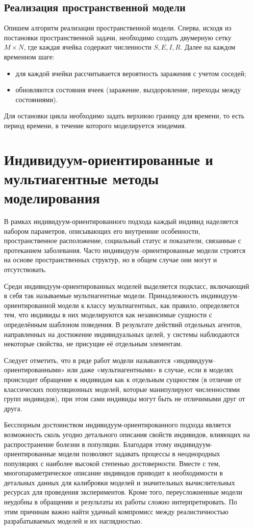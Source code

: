 \documentclass[a4paper, 14pt]{extreport}
\numberwithin{equation}{section}
\begin{document}
	\subsection{Реализация пространственной модели}
	Опишем алгоритм реализации пространственной модели.
	Сперва, исходя из постановки пространственной задачи, необходимо создать двумерную сетку $M\times N$, где каждая ячейка содержит численности $S,E,I,R$. Далее на каждом временном шаге:
	\begin{itemize}
		\item для каждой ячейки рассчитывается вероятность заражения с учетом соседей;
		\item обновляются состояния ячеек (заражение, выздоровление, переходы между состояниями).
	\end{itemize}
	Для остановки цикла необходимо задать верхнюю границу для времени, то есть период времени, в течение которого моделируется эпидемия.
	\section{Индивидуум-ориентированные и мультиагентные методы моделирования}
	В рамках индивидуум-ориентированного подхода каждый
	индивид наделяется набором параметров, описывающих его внутренние
	особенности, пространственное расположение, социальный статус и показатели,
	связанные с протеканием заболевания. Часто индивидуум–ориентированные
	модели строятся на основе пространственных структур, но в общем случае они
	могут и отсутствовать.
	
	Среди индивидуум-ориентированных моделей выделяется подкласс,
	включающий в себя так называемые мультиагентные модели. Принадлежность
	индивидуум–ориентированной модели к классу мультиагентных, как правило,
	определяется тем, что индивиды в них моделируются как независимые сущности с определённым шаблоном поведения. В результате действий
	отдельных агентов, направленных на достижение индивидуальных целей, у
	системы наблюдаются некоторые свойства, не присущие её отдельным
	элементам.
	
	Следует отметить, что в ряде работ модели называются «индивидуум–
	ориентированными» или даже «мультиагентными» в случае, если в моделях
	происходит обращение к индивидам как к отдельным сущностям (в отличие от
	классических популяционных моделей, которые манипулируют численностями
	групп индивидов), при этом сами индивиды могут быть не отличимыми друг от
	друга.
	
	Бесспорным достоинством индивидуум-ориентированного подхода является возможность сколь угодно детального
	описания свойств индивидов, влияющих на распространение болезни в
	популяции. Благодаря этому индивидуум-ориентированные модели позволяют
	задавать процессы в неоднородных популяциях с наиболее высокой степенью
	достоверности. Вместе с тем, многопараметрическое описание индивидов
	приводит к необходимости в детальных данных для калибровки моделей и
	значительных вычислительных ресурсах для проведения экспериментов. Кроме
	того, переусложненные модели неудобны в обращении и результаты их работы
	сложно интерпретировать. По этим причинам важно найти удачный
	компромисс между реалистичностью разрабатываемых моделей и их
	наглядностью.
	
\end{document}
